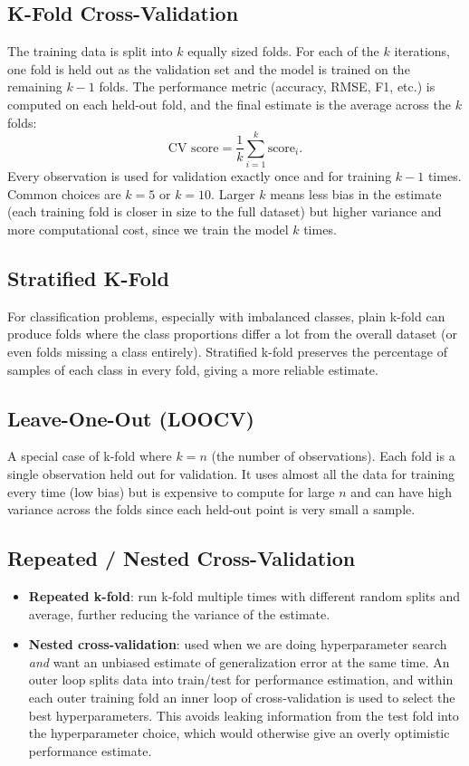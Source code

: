 \documentclass[conference]{IEEEtran}
\begin{document}
\subsection*{K-Fold Cross-Validation}
The training data is split into $k$ equally sized folds. For each of the $k$ iterations, one fold is held out as the validation set and the model is trained on the remaining $k-1$ folds. The performance metric (accuracy, RMSE, F1, etc.) is computed on each held-out fold, and the final estimate is the average across the $k$ folds:
\begin{equation}
    \text{CV score} = \frac{1}{k}\sum_{i=1}^{k} \text{score}_i.
\end{equation}
Every observation is used for validation exactly once and for training $k-1$ times. Common choices are $k=5$ or $k=10$. Larger $k$ means less bias in the estimate (each training fold is closer in size to the full dataset) but higher variance and more computational cost, since we train the model $k$ times.

\subsection*{Stratified K-Fold}
For classification problems, especially with imbalanced classes, plain k-fold can produce folds where the class proportions differ a lot from the overall dataset (or even folds missing a class entirely). Stratified k-fold preserves the percentage of samples of each class in every fold, giving a more reliable estimate.

\subsection*{Leave-One-Out (LOOCV)}
A special case of k-fold where $k = n$ (the number of observations). Each fold is a single observation held out for validation. It uses almost all the data for training every time (low bias) but is expensive to compute for large $n$ and can have high variance across the folds since each held-out point is very small a sample.

\subsection*{Repeated / Nested Cross-Validation}
\begin{itemize}
    \item \textbf{Repeated k-fold}: run k-fold multiple times with different random splits and average, further reducing the variance of the estimate.
    \item \textbf{Nested cross-validation}: used when we are doing hyperparameter search \textit{and} want an unbiased estimate of generalization error at the same time. An outer loop splits data into train/test for performance estimation, and within each outer training fold an inner loop of cross-validation is used to select the best hyperparameters. This avoids leaking information from the test fold into the hyperparameter choice, which would otherwise give an overly optimistic performance estimate.
\end{itemize}
\end{document}
